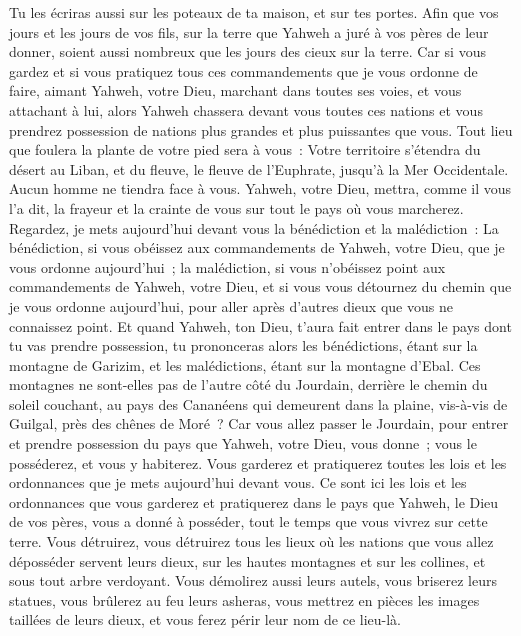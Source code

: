 \begin{multicols}{2}
Tu les écriras aussi sur les poteaux de ta maison, et sur tes portes.
Afin que vos jours et les jours de vos fils, sur la terre que Yahweh a juré à vos pères de leur donner, soient aussi nombreux que les jours des cieux sur la terre.
Car si vous gardez et si vous pratiquez tous ces commandements que je vous ordonne de faire, aimant Yahweh, votre Dieu, marchant dans toutes ses voies, et vous attachant à lui,
alors Yahweh chassera devant vous toutes ces nations et vous prendrez possession de nations plus grandes et plus puissantes que vous.
Tout lieu que foulera la plante de votre pied sera à vous~: Votre territoire s'étendra du désert au Liban, et du fleuve, le fleuve de l'Euphrate, jusqu'à la Mer Occidentale.
Aucun homme ne tiendra face à vous. Yahweh, votre Dieu, mettra, comme il vous l'a dit, la frayeur et la crainte de vous sur tout le pays où vous marcherez.
Regardez, je mets aujourd'hui devant vous la bénédiction et la malédiction~:
La bénédiction, si vous obéissez aux commandements de Yahweh, votre Dieu, que je vous ordonne aujourd'hui~;
la malédiction, si vous n'obéissez point aux commandements de Yahweh, votre Dieu, et si vous vous détournez du chemin que je vous ordonne aujourd'hui, pour aller après d'autres dieux que vous ne connaissez point.
Et quand Yahweh, ton Dieu, t'aura fait entrer dans le pays dont tu vas prendre possession, tu prononceras alors les bénédictions, étant sur la montagne de Garizim, et les malédictions, étant sur la montagne d'Ebal.
Ces montagnes ne sont-elles pas de l'autre côté du Jourdain, derrière le chemin du soleil couchant, au pays des Cananéens qui demeurent dans la plaine, vis-à-vis de Guilgal, près des chênes de Moré~?
Car vous allez passer le Jourdain, pour entrer et prendre possession du pays que Yahweh, votre Dieu, vous donne~; vous le posséderez, et vous y habiterez.
Vous garderez et pratiquerez toutes les lois et les ordonnances que je mets aujourd'hui devant vous.
\VerseOne{}Ce sont ici les lois et les ordonnances que vous garderez et pratiquerez dans le pays que Yahweh, le Dieu de vos pères, vous a donné à posséder, tout le temps que vous vivrez sur cette terre.
Vous détruirez, vous détruirez tous les lieux où les nations que vous allez déposséder servent leurs dieux, sur les hautes montagnes et sur les collines, et sous tout arbre verdoyant.
Vous démolirez aussi leurs autels, vous briserez leurs statues, vous brûlerez au feu leurs asheras, vous mettrez en pièces les images taillées de leurs dieux, et vous ferez périr leur nom de ce lieu-là.

\end{multicols}
